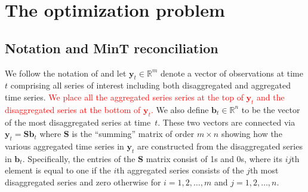 \documentclass[twocolumn]{svjour3}
\begin{document}
\section{The optimization problem}

\subsection{Notation and MinT reconciliation}

We follow the notation of \citet{Wick2018} and let $\bm{y}_t \in \mathbb{R}^m$ denote a vector of observations at time $t$ comprising all series of interest including both disaggregated and aggregated time series. \textcolor{red}{We place all the aggregated series series at the top of $\bm{y}_t$ and the disaggregated series at the bottom of  $\bm{y}_t$.} We also define $\bm{b}_t \in \mathbb{R}^n$ to be the vector of the most disaggregated series at time~$t$. These two vectors are connected via $\bm{y}_t=\bm{S}\bm{b}_t$ where $\bm{S}$ is the ``summing'' matrix of order $m \times n$ showing how the various aggregated time series in $\bm{y}_t$ are constructed from the disaggregated series in $\bm{b}_t$. {\color{red} Specifically, the entries of the $\bm{S}$ matrix consist of 1s and 0s, where its $ij$th element is equal to one if the $i$th aggregated series consists of the $j$th most disaggregated series and zero otherwise for $i = 1, 2, \dots, m$ and $j = 1, 2, \dots, n$.} 
\end{document}
